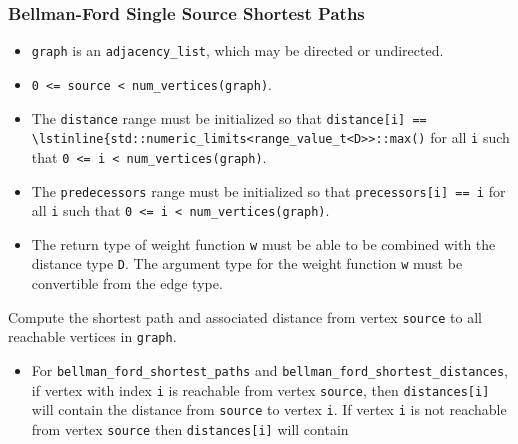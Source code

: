 \subsubsection{Bellman-Ford Single Source Shortest Paths}

{\small
      
}

\begin{itemdescr}
      \pnum\preconditions
      \begin{itemize}
            \item
                  \lstinline{graph} is an \lstinline{adjacency_list}, which may be directed or
                  undirected.
            \item
                  \lstinline{0 <= source < num_vertices(graph)}.
            \item
                  The \lstinline{distance} range must be initialized so that
                  \lstinline{distance[i] ==  \lstinline{std::numeric_limits<range_value_t<D>>::max()}
                  for all \lstinline{i}
                  such that \lstinline{0 <= i < num_vertices(graph)}.  
            \item
                  The \lstinline{predecessors} range must be initialized so that
                  \lstinline{precessors[i] == i} for all \lstinline{i} such that
                  \lstinline{0 <= i < num_vertices(graph)}.
            \item
                  The return type of weight function \lstinline{w} must be able to
                  be combined with the distance type \lstinline{D}.  The argument type for the weight
                  function \lstinline{w} must be convertible from the edge type.
      \end{itemize}
      \pnum
      \effects Compute the shortest path and associated distance from vertex
      \lstinline{source} to all reachable vertices in \lstinline{graph}.
      \pnum\returns
      \begin{itemize}
            \item For \lstinline{bellman_ford_shortest_paths} and \lstinline{bellman_ford_shortest_distances},
                  if vertex with index \lstinline{i} is reachable from vertex \lstinline{source}, then
                  \lstinline{distances[i]} will contain the distance from \lstinline{source} to vertex
                  \lstinline{i}.  If vertex \lstinline{i} is not reachable from vertex
                  \lstinline{source} then \lstinline{distances[i]} will contain

\end{itemize}
\end{itemdescr}
